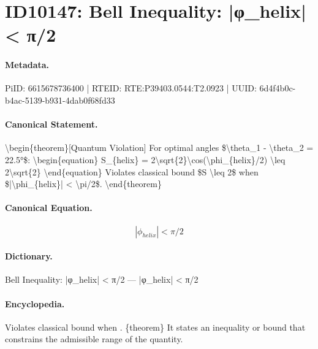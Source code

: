 \section*{ID10147: Bell Inequality: |φ\_helix| < π/2}
\paragraph{Metadata.}
PiID: 6615678736400 | RTEID: RTE:P39403.0544:T2.0923 | UUID: 6d4f4b0c-b4ac-5139-b931-4dab0f68fd33

\paragraph{Canonical Statement.}
\textbackslash{}begin\{theorem\}[Quantum Violation] For optimal angles \$\textbackslash{}theta\_1 - \textbackslash{}theta\_2 = 22.5°\$: \textbackslash{}begin\{equation\} S\_\{helix\} = 2\textbackslash{}sqrt\{2\}\textbackslash{}cos(\textbackslash{}phi\_\{helix\}/2) \textbackslash{}leq 2\textbackslash{}sqrt\{2\} \textbackslash{}end\{equation\} Violates classical bound \$S \textbackslash{}leq 2\$ when \$|\textbackslash{}phi\_\{helix\}| < \textbackslash{}pi/2\$. \textbackslash{}end\{theorem\}

\paragraph{Canonical Equation.}
\[
|\phi_{helix}| < \pi/2
\]

\paragraph{Dictionary.}
Bell Inequality: |φ\_helix| < π/2 — |φ\_helix| < π/2

\paragraph{Encyclopedia.}
Violates classical bound when . \{theorem\} It states an inequality or bound that constrains the admissible range of the quantity.
